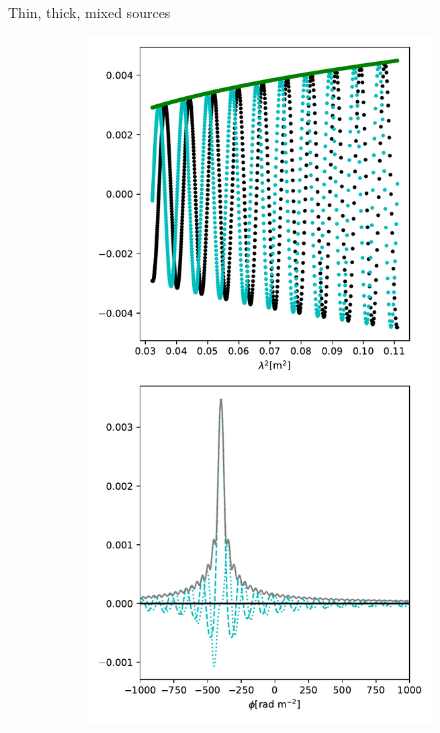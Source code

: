 \documentclass[xetex,aspectratio=169]{beamer}
\begin{document}
    
    
    \begin{frame}{Thin, thick, mixed sources}
    
    \begin{figure}
            \centering
            
            \begin{subfigure}{0.2\textwidth}
                \includegraphics[width=\textwidth]{figures/sources/thin_source.pdf}

\end{subfigure}
\end{figure}
\end{frame}
\end{document}
